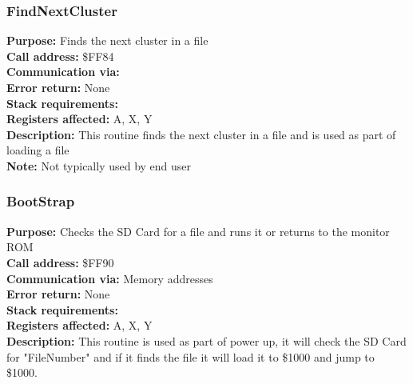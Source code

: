 \subsubsection{FindNextCluster}
\textbf{Purpose:} Finds the next cluster in a file\\
\textbf{Call address:} \$FF84\\
\textbf{Communication via:}\\
\textbf{Error return:} None\\
\textbf{Stack requirements:}\\
\textbf{Registers affected:} A, X, Y\\
\textbf{Description:} This routine finds the next cluster in a file and is used as part of loading a file\\
\textbf{Note:} Not typically used by end user\\

\subsubsection{BootStrap}
\textbf{Purpose:} Checks the SD Card for a file and runs it or returns to the monitor ROM\\
\textbf{Call address:} \$FF90\\
\textbf{Communication via:} Memory addresses\\
\textbf{Error return:} None\\
\textbf{Stack requirements:} \\
\textbf{Registers affected:} A, X, Y\\
\textbf{Description:} This routine is used as part of power up, it will check the SD Card for "FileNumber" and if it finds the file it will load it to \$1000 and jump to \$1000.\\




